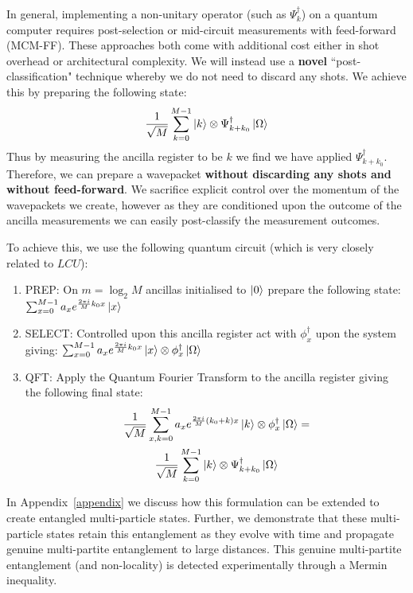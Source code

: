 \documentclass[aps,floatfix,10pt,amssymb,amsfont,amsmath,superscriptaddress,float,nofootinbib,longbibliography,nobalancelastpage,twocolumn,prx]{revtex4-2}
\begin{document}
In general, implementing a non-unitary operator (such as $\Psi^{\dagger}_k$) on a quantum computer requires post-selection or mid-circuit measurements with feed-forward (MCM-FF). These approaches both come with additional cost either in shot overhead or architectural complexity. We will instead use a \textbf{novel} ``post-classification" technique whereby we do not need to discard any shots. We achieve this by preparing the following state:
\begin{equation}
    \frac{1}{\sqrt{M}}\sum_{k=0}^{M-1} \ket{k}\otimes\Psi_{k+k_0}^{\dagger}\ket{\Omega} 
\end{equation}
Thus by measuring the ancilla register to be $k$ we find we have applied $\Psi^{\dagger}_{k + k_0}$. Therefore, we can prepare a wavepacket \textbf{without discarding any shots and without feed-forward}. We sacrifice explicit control over the momentum of the wavepackets we create, however as they are conditioned upon the outcome of the ancilla measurements we can easily post-classify the measurement outcomes.

To achieve this, we use the following quantum circuit (which is very closely related to $LCU$):
\begin{enumerate}
    \item \textsc{PREP}: On $m = \log_2 M$ ancillas initialised to $\ket{0}$ prepare the following state: $
        \sum_{x=0}^{M-1} a_xe^{\frac{2\pi i}{M}k_0x} \ket{x}$
    \item \textsc{SELECT}: Controlled upon this ancilla register act with $\phi^{\dagger}_x$ upon the system giving:
    $\sum_{x=0}^{M-1} a_xe^{\frac{2\pi i}{M}k_0x} \ket{x}\otimes \phi^{\dagger}_x\ket{\Omega}
    $
    \item \textsc{QFT}: Apply the Quantum Fourier Transform to the ancilla register giving the following final state:
    \begin{multline}
       \frac{1}{\sqrt{M}} \sum_{x,k=0}^{M-1} a_xe^{\frac{2\pi i}{M}(k_0+k)x} \ket{k}\otimes \phi^{\dagger}_x\ket{\Omega} = \\\frac{1}{\sqrt{M}}\sum_{k=0}^{M-1}  \ket{k}\otimes \Psi^{\dagger}_{k+k_0}\ket{\Omega}
    \end{multline}
\end{enumerate}
In Appendix~\ref{appendix} we discuss how this formulation can be extended to create entangled multi-particle states. Further, we demonstrate that these multi-particle states retain this entanglement as they evolve with time and propagate genuine multi-partite entanglement to large distances. This genuine multi-partite entanglement (and non-locality) is detected experimentally through a Mermin inequality.
\end{document}
